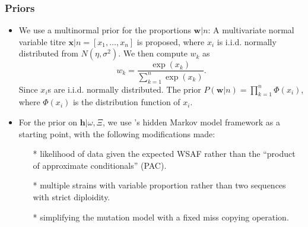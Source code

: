 \documentclass{bioinfo}
\begin{document}
\subsubsection{Priors}\label{sec:prior}
\begin{itemize}
\item We use a multinormal prior for the proportions $\mathbf{w}|n$: A multivariate normal variable titre ${\mathbf x}|n = [x_1,\dots,x_n]$ is proposed, where $x_i$ is i.i.d. normally distributed from $N(\eta, \sigma^2)$. We then compute $w_k$ as
$$w_k = \frac{\exp(x_k)}{\sum_{k=1}^n \exp(x_k)}.$$ Since $x_i$s are i.i.d. normally distributed. The prior $P(\mathbf{w}|n) = \displaystyle\prod_{k=1}^n \Phi(x_i)$, where $\Phi(x_i)$ is the distribution function of $x_i$.


\item For the prior on $\mathbf{h} | \omega, \Xi$, we use \citet{Li2003}'s hidden Markov model framework as a starting point, with the following modifications made:
\begin{itemize}
\item[*] likelihood of data given the expected WSAF rather than the ``product of approximate conditionals'' (PAC).
\item[*] multiple strains with variable proportion rather than two sequences with strict diploidity.
\item[*] simplifying the mutation model with a fixed miss copying operation.
\end{itemize}


\end{itemize}
\end{document}
